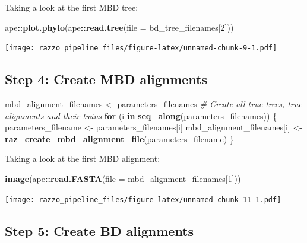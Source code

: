 \documentclass[]{article}
\newenvironment{Shaded}{\begin{snugshade}}{\end{snugshade}}
\newcommand{\KeywordTok}[1]{\textcolor[rgb]{0.13,0.29,0.53}{\textbf{#1}}}
\newcommand{\DataTypeTok}[1]{\textcolor[rgb]{0.13,0.29,0.53}{#1}}
\newcommand{\DecValTok}[1]{\textcolor[rgb]{0.00,0.00,0.81}{#1}}
\newcommand{\StringTok}[1]{\textcolor[rgb]{0.31,0.60,0.02}{#1}}
\newcommand{\CommentTok}[1]{\textcolor[rgb]{0.56,0.35,0.01}{\textit{#1}}}
\newcommand{\ControlFlowTok}[1]{\textcolor[rgb]{0.13,0.29,0.53}{\textbf{#1}}}
\newcommand{\OperatorTok}[1]{\textcolor[rgb]{0.81,0.36,0.00}{\textbf{#1}}}
\newcommand{\NormalTok}[1]{#1}
\begin{document}
Taking a look at the first MBD tree:

\begin{Shaded}
\begin{Highlighting}[]
\NormalTok{ape}\OperatorTok{::}\KeywordTok{plot.phylo}\NormalTok{(ape}\OperatorTok{::}\KeywordTok{read.tree}\NormalTok{(}\DataTypeTok{file =}\NormalTok{ bd_tree_filenames[}\DecValTok{2}\NormalTok{]))}
\end{Highlighting}
\end{Shaded}

\texttt{[image: razzo\_pipeline\_files/figure-latex/unnamed-chunk-9-1.pdf]}

\subsection{Step 4: Create MBD
alignments}\label{step-4-create-mbd-alignments}

\begin{Shaded}
\begin{Highlighting}[]
\NormalTok{mbd_alignment_filenames <-}\StringTok{ }\NormalTok{parameters_filenames}
\CommentTok{# Create all true trees, true alignments and their twins}
\ControlFlowTok{for}\NormalTok{ (i }\ControlFlowTok{in} \KeywordTok{seq_along}\NormalTok{(parameters_filenames)) \{}
\NormalTok{  parameters_filename <-}\StringTok{ }\NormalTok{parameters_filenames[i]}
\NormalTok{  mbd_alignment_filenames[i] <-}\StringTok{ }\KeywordTok{raz_create_mbd_alignment_file}\NormalTok{(parameters_filename)}
\NormalTok{\}}
\end{Highlighting}
\end{Shaded}

Taking a look at the first MBD alignment:

\begin{Shaded}
\begin{Highlighting}[]
\KeywordTok{image}\NormalTok{(ape}\OperatorTok{::}\KeywordTok{read.FASTA}\NormalTok{(}\DataTypeTok{file =}\NormalTok{ mbd_alignment_filenames[}\DecValTok{1}\NormalTok{]))}
\end{Highlighting}
\end{Shaded}

\texttt{[image: razzo\_pipeline\_files/figure-latex/unnamed-chunk-11-1.pdf]}

\subsection{Step 5: Create BD
alignments}\label{step-5-create-bd-alignments}
\end{document}
